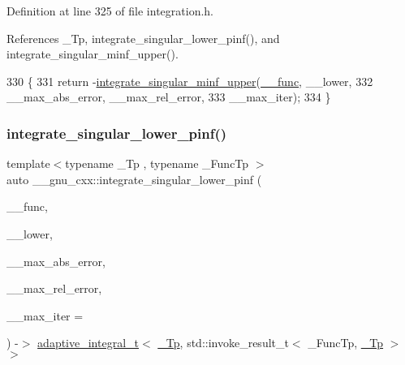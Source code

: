 Definition at line 325 of file integration.\+h.



References \+\_\+\+Tp, integrate\+\_\+singular\+\_\+lower\+\_\+pinf(), and integrate\+\_\+singular\+\_\+minf\+\_\+upper().


\begin{DoxyCode}
330     \{
331       \textcolor{keywordflow}{return} -\hyperlink{namespace____gnu__cxx_add15531ace95d18f7fe52a63dd8a7113}{integrate\_singular\_minf\_upper}(\hyperlink{namespace____gnu__cxx_af2b2f0c7a2ae72b922b1afefae5a65b2}{\_\_func}, \_\_lower,
332                                             \_\_max\_abs\_error, \_\_max\_rel\_error,
333                                             \_\_max\_iter);
334     \}
\end{DoxyCode}
\mbox{\label{namespace____gnu__cxx_aead3b14ccced37c14f64ecd358a2b0c8}} 
\subsubsection{\texorpdfstring{integrate\+\_\+singular\+\_\+lower\+\_\+pinf()}{integrate\_singular\_lower\_pinf()}}
{\footnotesize\ttfamily template$<$typename \+\_\+\+Tp , typename \+\_\+\+Func\+Tp $>$ \\
auto \+\_\+\+\_\+gnu\+\_\+cxx\+::integrate\+\_\+singular\+\_\+lower\+\_\+pinf (\begin{DoxyParamCaption}\item[{\+\_\+\+Func\+Tp}]{\+\_\+\+\_\+func,  }\item[{\hyperlink{namespace____gnu__cxx_a3b19a9c800ca194374ef9172290f7d79}{\+\_\+\+Tp}}]{\+\_\+\+\_\+lower,  }\item[{\hyperlink{namespace____gnu__cxx_a3b19a9c800ca194374ef9172290f7d79}{\+\_\+\+Tp}}]{\+\_\+\+\_\+max\+\_\+abs\+\_\+error,  }\item[{\hyperlink{namespace____gnu__cxx_a3b19a9c800ca194374ef9172290f7d79}{\+\_\+\+Tp}}]{\+\_\+\+\_\+max\+\_\+rel\+\_\+error,  }\item[{std\+::size\+\_\+t}]{\+\_\+\+\_\+max\+\_\+iter = {} }\end{DoxyParamCaption}) -\/$>$  \hyperlink{struct____gnu__cxx_1_1adaptive__integral__t}{adaptive\+\_\+integral\+\_\+t}$<$ \hyperlink{namespace____gnu__cxx_a3b19a9c800ca194374ef9172290f7d79}{\+\_\+\+Tp}, std\+::invoke\+\_\+result\+\_\+t$<$ \+\_\+\+Func\+Tp, \hyperlink{namespace____gnu__cxx_a3b19a9c800ca194374ef9172290f7d79}{\+\_\+\+Tp} $>$$>$}


